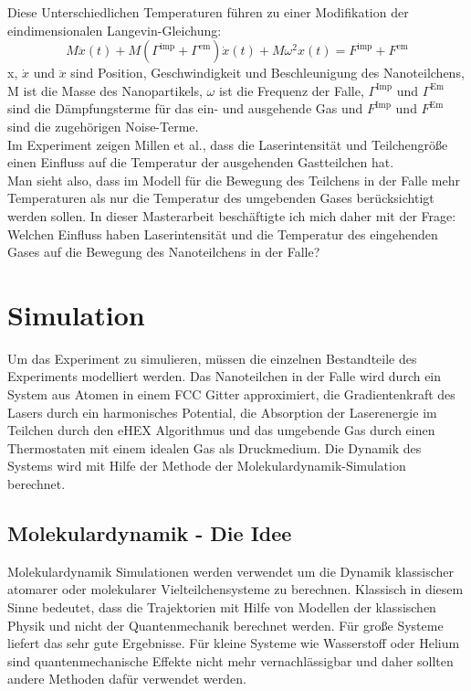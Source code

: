 \documentclass[12pt]{article}
\begin{document}
Diese Unterschiedlichen Temperaturen führen zu einer Modifikation der eindimensionalen Langevin-Gleichung:
\begin{equation}
    M\ddot{x}(t) + M\left(\Gamma^\text{imp}+\Gamma^\text{em}\right)\dot{x}(t) + M\omega^2x(t) =F^\text{imp}+F^\text{em}
\end{equation}
x, $\dot{x}$ und $\ddot{x}$ sind Position, Geschwindigkeit und Beschleunigung des Nanoteilchens, M ist die Masse des Nanopartikels, 
$\omega$ ist die Frequenz der Falle, $\Gamma^\text{Imp}$ und $\Gamma^\text{Em}$ sind die Dämpfungsterme für das ein- und ausgehende Gas
und $F^\text{Imp}$ und $F^\text{Em}$ sind die zugehörigen Noise-Terme.\\
Im Experiment zeigen Millen et al., dass die Laserintensität und Teilchengröße einen Einfluss auf die Temperatur der ausgehenden Gastteilchen hat.\\
Man sieht also, dass im Modell für die Bewegung des Teilchens in der Falle mehr Temperaturen als nur die Temperatur des umgebenden Gases
berücksichtigt werden sollen. In dieser Masterarbeit beschäftigte ich mich daher mit der Frage: Welchen Einfluss haben Laserintensität
und die Temperatur des eingehenden Gases auf die Bewegung des Nanoteilchens in der Falle?



\section{Simulation}
Um das Experiment zu simulieren, müssen die einzelnen Bestandteile des Experiments modelliert werden. Das Nanoteilchen in der Falle
wird durch ein System aus Atomen in einem FCC Gitter approximiert, die Gradientenkraft des Lasers durch ein harmonisches Potential, 
die Absorption der Laserenergie im Teilchen durch den eHEX Algorithmus und das umgebende Gas durch einen Thermostaten mit einem idealen Gas
als Druckmedium. Die Dynamik des Systems wird mit Hilfe der Methode der Molekulardynamik-Simulation berechnet.\\
\subsection{Molekulardynamik - Die Idee}
Molekulardynamik Simulationen werden verwendet um die Dynamik klassischer atomarer oder molekularer Vielteilchensysteme zu berechnen. 
Klassisch
in diesem Sinne bedeutet, dass die Trajektorien mit Hilfe von Modellen der klassischen Physik und nicht der Quantenmechanik 
berechnet werden. Für große Systeme liefert das sehr gute Ergebnisse. Für kleine Systeme wie Wasserstoff oder Helium sind quantenmechanische
Effekte nicht mehr vernachlässigbar und daher sollten andere Methoden dafür verwendet werden.
\end{document}

